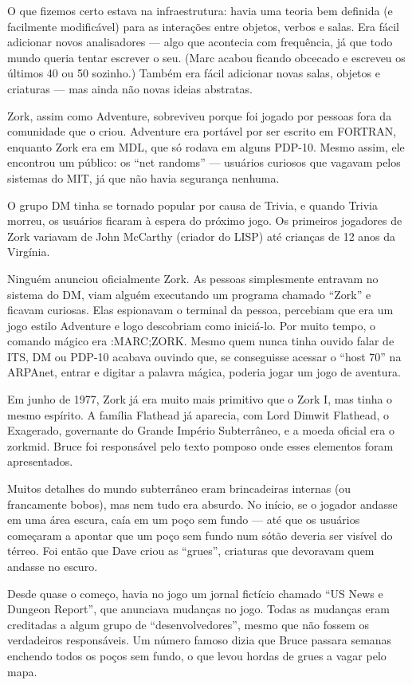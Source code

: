 \documentclass[12pt,a4paper]{article}
\begin{document}
O que fizemos certo estava na infraestrutura: havia uma teoria bem definida (e facilmente modificável) para as interações entre objetos, verbos e salas. Era fácil adicionar novos analisadores — algo que acontecia com frequência, já que todo mundo queria tentar escrever o seu. (Marc acabou ficando obcecado e escreveu os últimos 40 ou 50 sozinho.) Também era fácil adicionar novas salas, objetos e criaturas — mas ainda não novas ideias abstratas.

Zork, assim como Adventure, sobreviveu porque foi jogado por pessoas fora da comunidade que o criou. Adventure era portável por ser escrito em FORTRAN, enquanto Zork era em MDL, que só rodava em alguns PDP-10. Mesmo assim, ele encontrou um público: os “net randoms” — usuários curiosos que vagavam pelos sistemas do MIT, já que não havia segurança nenhuma.

O grupo DM tinha se tornado popular por causa de Trivia, e quando Trivia morreu, os usuários ficaram à espera do próximo jogo. Os primeiros jogadores de Zork variavam de John McCarthy (criador do LISP) até crianças de 12 anos da Virgínia.

Ninguém anunciou oficialmente Zork. As pessoas simplesmente entravam no sistema do DM, viam alguém executando um programa chamado “Zork” e ficavam curiosas. Elas espionavam o terminal da pessoa, percebiam que era um jogo estilo Adventure e logo descobriam como iniciá-lo. Por muito tempo, o comando mágico era :MARC;ZORK. Mesmo quem nunca tinha ouvido falar de ITS, DM ou PDP-10 acabava ouvindo que, se conseguisse acessar o “host 70” na ARPAnet, entrar e digitar a palavra mágica, poderia jogar um jogo de aventura.

Em junho de 1977, Zork já era muito mais primitivo que o Zork I, mas tinha o mesmo espírito. A família Flathead já aparecia, com Lord Dimwit Flathead, o Exagerado, governante do Grande Império Subterrâneo, e a moeda oficial era o zorkmid. Bruce foi responsável pelo texto pomposo onde esses elementos foram apresentados.

Muitos detalhes do mundo subterrâneo eram brincadeiras internas (ou francamente bobos), mas nem tudo era absurdo. No início, se o jogador andasse em uma área escura, caía em um poço sem fundo — até que os usuários começaram a apontar que um poço sem fundo num sótão deveria ser visível do térreo. Foi então que Dave criou as “grues”, criaturas que devoravam quem andasse no escuro.

Desde quase o começo, havia no jogo um jornal fictício chamado “US News e Dungeon Report”, que anunciava mudanças no jogo. Todas as mudanças eram creditadas a algum grupo de “desenvolvedores”, mesmo que não fossem os verdadeiros responsáveis. Um número famoso dizia que Bruce passara semanas enchendo todos os poços sem fundo, o que levou hordas de grues a vagar pelo mapa.
\end{document}
